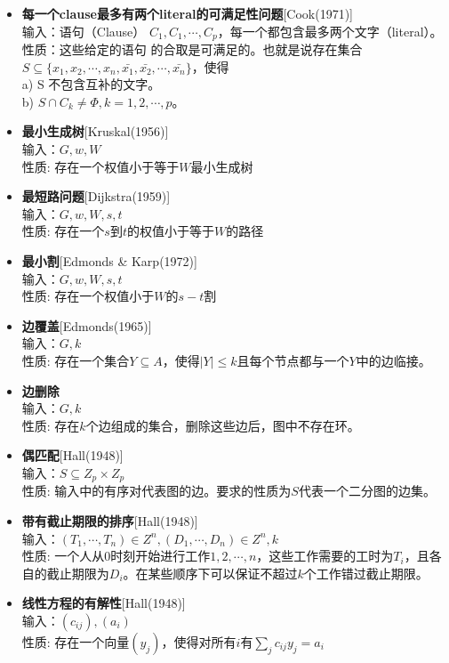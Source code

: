 \documentclass[twocolumn]{article}
\theoremstyle{nonumberplain}%
\begin{document}
    \begin{itemize}
    \item {\bf 每一个clause最多有两个literal的可满足性问题}[Cook(1971)]\\
    输入：语句（Clause） $C_1,C_1,\cdots,C_p$，每一个都包含最多两个文字（literal）。\\
    性质：这些给定的语句 的合取是可满足的。也就是说存在集合$S\subseteq\{x_1,x_2,\cdots,x_n,\bar{x_1},\bar{x_2},\cdots,\bar{x_n}\}$，使得 \\
    \indent a) S 不包含互补的文字。\\
    \indent b) $S\cap C_k \neq \Phi, k = 1,2,\cdots,p$。

    \item {\bf 最小生成树}[Kruskal(1956)]\\
    输入：$G, w, W$\\
    性质: 存在一个权值小于等于$W$最小生成树

    \item {\bf 最短路问题}[Dijkstra(1959)]\\
    输入：$G, w, W, s, t$\\
    性质: 存在一个$s$到$t$的权值小于等于$W$的路径

    \item {\bf 最小割}[Edmonds \& Karp(1972)]\\
    输入：$G, w, W, s, t$\\
    性质: 存在一个权值小于$W$的$s-t$割

    \item {\bf 边覆盖}[Edmonds(1965)]\\
    输入：$G, k$\\
    性质: 存在一个集合$Y\subseteq A$，使得$|Y|\le k$且每个节点都与一个$Y$中的边临接。

    \item {\bf 边删除}\\
    输入：$G, k$\\
    性质: 存在$k$个边组成的集合，删除这些边后，图中不存在环。

    \item {\bf 偶匹配}[Hall(1948)]\\
    输入：$S\subseteq Z_p \times Z_p $\\
    性质: 输入中的有序对代表图的边。要求的性质为$S$代表一个二分图的边集。

    \item {\bf 带有截止期限的排序}[Hall(1948)]\\
    输入：$(T_1,\cdots,T_n)\in Z^n, (D_1,\cdots,D_n)\in Z^n, k$\\
    性质: 一个人从0时刻开始进行工作$1,2,\cdots,n$，这些工作需要的工时为$T_i$，且各自的截止期限为$D_i$。在某些顺序下可以保证不超过$k$个工作错过截止期限。

    \item {\bf 线性方程的有解性}[Hall(1948)]\\
    输入：$(c_{ij}), (a_i)$\\
    性质: 存在一个向量$(y_j)$，使得对所有$i$有$\sum_j c_{ij}y_j = a_i$
    \end{itemize}
\end{document}
